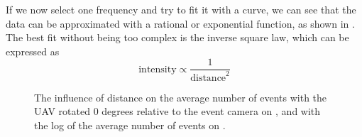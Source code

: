 If we now select one frequency and try to fit it with a curve,
we can see that the data can be approximated with a rational or exponential function, as shown in .
The best fit without being too complex is the inverse square law, which can be expressed as
\begin{equation}
	\text{intensity} \propto \frac{1}{\text{distance}^2}
\end{equation}

\begin{figure}[H]
	\centering
	\caption{
  The influence of distance on the average number of events with the UAV rotated 0 degrees relative to the event camera on , and with the log of the average number of events on .
  }
	\label{fig:dist}
\end{figure}
